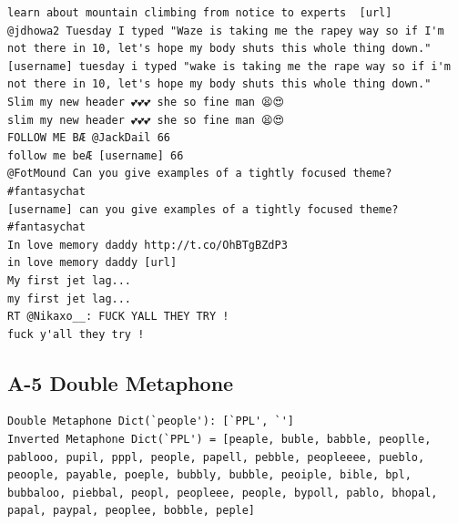 \documentclass[twocolumn,10pt]{article}
\begin{document}
\begin{lstlisting}
learn about mountain climbing from notice to experts  [url]
@jdhowa2 Tuesday I typed "Waze is taking me the rapey way so if I'm not there in 10, let's hope my body shuts this whole thing down."
[username] tuesday i typed "wake is taking me the rape way so if i'm not there in 10, let's hope my body shuts this whole thing down."
Slim my new header 💕💕💕 she so fine man 😫😍
slim my new header 💕💕💕 she so fine man 😫😍
FOLLOW ME BÆ @JackDail 66
follow me beÆ [username] 66
@FotMound Can you give examples of a tightly focused theme? #fantasychat
[username] can you give examples of a tightly focused theme? #fantasychat
In love memory daddy http://t.co/OhBTgBZdP3
in love memory daddy [url]
My first jet lag...
my first jet lag...
RT @Nikaxo__: FUCK YALL THEY TRY !
fuck y'all they try !
\end{lstlisting}

\subsection*{A-5 Double Metaphone}
\begin{lstlisting}
Double Metaphone Dict(`people'): [`PPL', `']
Inverted Metaphone Dict(`PPL') = [peaple, buble, babble, peoplle, pablooo, pupil, pppl, people, papell, pebble, peopleeee, pueblo, peoople, payable, poeple, bubbly, bubble, peoiple, bible, bpl, bubbaloo, piebbal, peopl, peopleee, people, bypoll, pablo, bhopal, papal, paypal, peoplee, bobble, peple]
\end{lstlisting}

\end{document}
